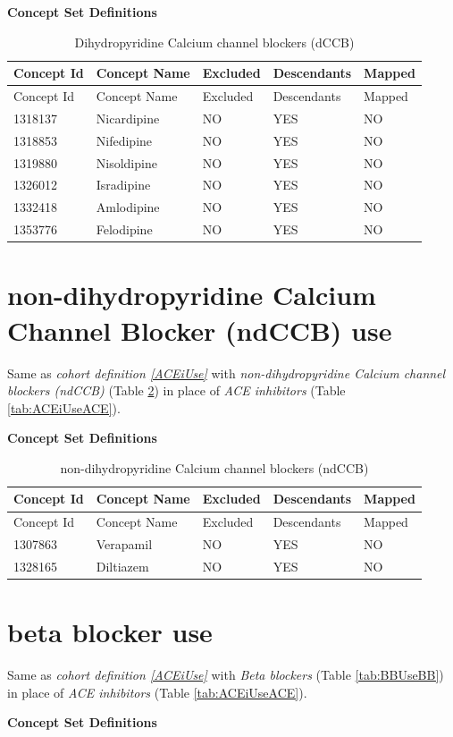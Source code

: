 \documentclass[11pt]{book}
\theoremstyle{definition}
\theoremstyle{definition}
\theoremstyle{definition}
\theoremstyle{remark}
\begin{document}
\textbf{Concept Set Definitions}

\begin{longtable}[]{@{}lllll@{}}
\caption{\label{tab:dCCBUsedCBB} Dihydropyridine Calcium channel blockers (dCCB)}\tabularnewline
\toprule
Concept Id & Concept Name & Excluded & Descendants & Mapped\tabularnewline
\midrule
\endfirsthead
\toprule
Concept Id & Concept Name & Excluded & Descendants & Mapped\tabularnewline
\midrule
\endhead
1318137 & Nicardipine & NO & YES & NO\tabularnewline
1318853 & Nifedipine & NO & YES & NO\tabularnewline
1319880 & Nisoldipine & NO & YES & NO\tabularnewline
1326012 & Isradipine & NO & YES & NO\tabularnewline
1332418 & Amlodipine & NO & YES & NO\tabularnewline
1353776 & Felodipine & NO & YES & NO\tabularnewline
\bottomrule
\end{longtable}

\hypertarget{ndCCBUse}{%
\section{non-dihydropyridine Calcium Channel Blocker (ndCCB) use}\label{ndCCBUse}}

Same as \emph{cohort definition \ref{ACEiUse}} with \emph{non-dihydropyridine Calcium channel blockers (ndCCB)} (Table \ref{tab:ndCCBUsendCCB}) in place of \emph{ACE inhibitors} (Table \ref{tab:ACEiUseACE}).

\textbf{Concept Set Definitions}

\begin{longtable}[]{@{}lllll@{}}
\caption{\label{tab:ndCCBUsendCCB} non-dihydropyridine Calcium channel blockers (ndCCB)}\tabularnewline
\toprule
Concept Id & Concept Name & Excluded & Descendants & Mapped\tabularnewline
\midrule
\endfirsthead
\toprule
Concept Id & Concept Name & Excluded & Descendants & Mapped\tabularnewline
\midrule
\endhead
1307863 & Verapamil & NO & YES & NO\tabularnewline
1328165 & Diltiazem & NO & YES & NO\tabularnewline
\bottomrule
\end{longtable}

\hypertarget{BBUse}{%
\section{beta blocker use}\label{BBUse}}

Same as \emph{cohort definition \ref{ACEiUse}} with \emph{Beta blockers} (Table \ref{tab:BBUseBB}) in place of \emph{ACE inhibitors} (Table \ref{tab:ACEiUseACE}).

\textbf{Concept Set Definitions}
\end{document}
